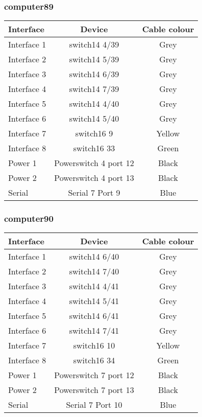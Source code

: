 \subsubsection{computer89}

\begin{table}[H]
\begin{tabular}{|l|c|c|}\hline
Interface & Device & Cable colour \\ \hline
Interface 1 & switch14 4/39 & Grey \\
Interface 2 & switch14 5/39 & Grey \\
Interface 3 & switch14 6/39 & Grey \\
Interface 4 & switch14 7/39 & Grey \\
Interface 5 & switch14 4/40 & Grey \\
Interface 6 & switch14 5/40 & Grey \\
Interface 7 & switch16 9 & Yellow \\
Interface 8 & switch16 33 & Green \\
Power 1 & Powerswitch 4 port 12 & Black \\
Power 2 & Powerswitch 4 port 13 & Black \\
Serial & Serial 7 Port 9 & Blue \\ \hline
\end{tabular}
\end{table}

\subsubsection{computer90}

\begin{table}[H]
\begin{tabular}{|l|c|c|}\hline
Interface & Device & Cable colour \\ \hline
Interface 1 & switch14 6/40 & Grey \\
Interface 2 & switch14 7/40 & Grey \\
Interface 3 & switch14 4/41 & Grey \\
Interface 4 & switch14 5/41 & Grey \\
Interface 5 & switch14 6/41 & Grey \\
Interface 6 & switch14 7/41 & Grey \\
Interface 7 & switch16 10 & Yellow \\
Interface 8 & switch16 34 & Green \\
Power 1 & Powerswitch 7 port 12 & Black \\
Power 2 & Powerswitch 7 port 13 & Black \\
Serial & Serial 7 Port 10 & Blue \\ \hline
\end{tabular}
\end{table}

